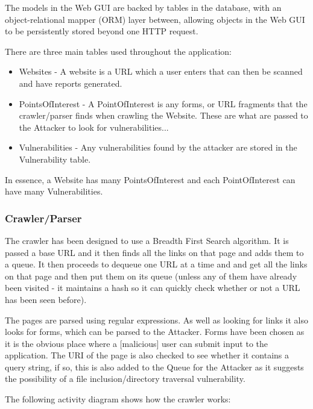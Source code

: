 \documentclass[12pt,a4paper]{article}
\begin{document}
The models in the Web GUI are backed by tables in the database, with an object-relational mapper (ORM) layer between, allowing objects in the Web GUI to be persistently stored beyond one HTTP request.

There are three main tables used throughout the application:

\begin{itemize}
    \item{Websites - A website is a URL which a user enters that can then be scanned and have reports generated.}
    \item{PointsOfInterest - A PointOfInterest is any forms, or URL fragments that the crawler/parser finds when crawling the Website.  These are what are passed to the Attacker to look for vulnerabilities...}
    \item{Vulnerabilities - Any vulnerabilities found by the attacker are stored in the Vulnerability table.}
\end{itemize}

In essence, a Website has many PointsOfInterest and each PointOfInterest can have many Vulnerabilities.

\subsubsection{Crawler/Parser}
The crawler has been designed to use a Breadth First Search algorithm.  It is passed a base URL and it then finds all the links on that page and adds them to a queue.  It then proceeds to dequeue one URL at a time and and get all the links on that page and then put them on its queue (unless any of them have already been visited - it maintains a hash so it can quickly check whether or not a URL has been seen before).

The pages are parsed using regular expressions.  As well as looking for links it also looks for forms, which can be parsed to the Attacker.  Forms have been chosen as it is the obvious place where a [malicious] user can submit input to the application.  The URI of the page is also checked to see whether it contains a query string, if so, this is also added to the Queue for the Attacker as it suggests the possibility of a file inclusion/directory traversal vulnerability.

The following activity diagram shows how the crawler works:
\end{document}
